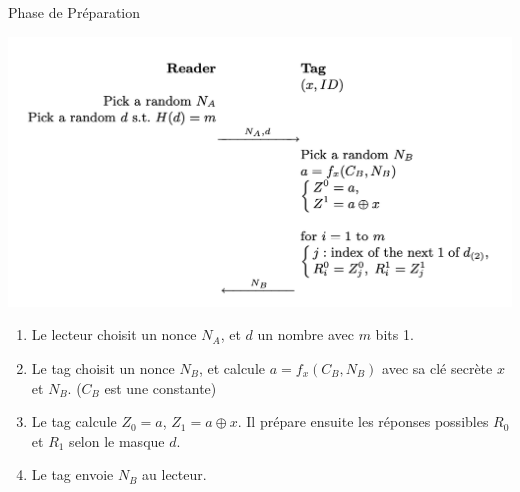 \documentclass[aspectratio=169]{beamer}
\begin{document}
\begin{frame}{Phase de Préparation}
  \begin{multicols}{2}
    \begin{minipage}[c]{\linewidth}
      \centering
      \bigskip
      \medskip
      \includegraphics[width=\linewidth]{../assets/sk-phase1.png}
    \end{minipage}

    \begin{minipage}[t]{\linewidth}
      \begin{enumerate}
        \item Le lecteur choisit un nonce $N_A$, et $d$ un nombre avec $m$ bits 1.
        \item Le tag choisit un nonce $N_B$, et calcule $a = f_x(C_B, N_B)$ avec sa clé secrète $x$ et $N_B$. ($C_B$ est une constante)
        \item Le tag calcule $Z_0 = a$, $Z_1 = a \oplus x$. Il prépare ensuite les réponses possibles $R_0$ et $R_1$ selon le masque $d$.
        \item Le tag envoie $N_B$ au lecteur.
      \end{enumerate}
    \end{minipage}
  \end{multicols}
\end{frame}
\end{document}
